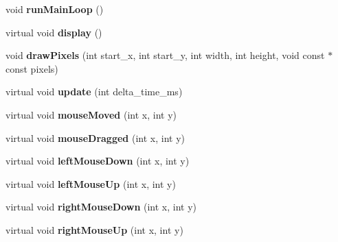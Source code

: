 \begin{DoxyCompactItemize}
\item 
\hypertarget{classBaseGfxApp_acda031916c00d56c2dc901e2653e3083}{void {\bfseries run\-Main\-Loop} ()}\label{classBaseGfxApp_acda031916c00d56c2dc901e2653e3083}

\item 
\hypertarget{classBaseGfxApp_ac8de2d5a955582547af5619b771b4d6d}{virtual void {\bfseries display} ()}\label{classBaseGfxApp_ac8de2d5a955582547af5619b771b4d6d}

\item 
\hypertarget{classBaseGfxApp_a4b8d896c2fff8482553207552bc54f0a}{void {\bfseries draw\-Pixels} (int start\-\_\-x, int start\-\_\-y, int width, int height, void const $\ast$const pixels)}\label{classBaseGfxApp_a4b8d896c2fff8482553207552bc54f0a}

\item 
\hypertarget{classBaseGfxApp_a67737f7cc360b008394b1e882ed5b5d6}{virtual void {\bfseries update} (int delta\-\_\-time\-\_\-ms)}\label{classBaseGfxApp_a67737f7cc360b008394b1e882ed5b5d6}

\item 
\hypertarget{classBaseGfxApp_a0956b82d7fa58b623c498aea7073dbba}{virtual void {\bfseries mouse\-Moved} (int x, int y)}\label{classBaseGfxApp_a0956b82d7fa58b623c498aea7073dbba}

\item 
\hypertarget{classBaseGfxApp_abb23f716dd6612b3a72938e41525d338}{virtual void {\bfseries mouse\-Dragged} (int x, int y)}\label{classBaseGfxApp_abb23f716dd6612b3a72938e41525d338}

\item 
\hypertarget{classBaseGfxApp_aaaccf5a5e923a9465441a5ee712424a8}{virtual void {\bfseries left\-Mouse\-Down} (int x, int y)}\label{classBaseGfxApp_aaaccf5a5e923a9465441a5ee712424a8}

\item 
\hypertarget{classBaseGfxApp_a0a2961a932b02b2f9d7d0bb408f6fb51}{virtual void {\bfseries left\-Mouse\-Up} (int x, int y)}\label{classBaseGfxApp_a0a2961a932b02b2f9d7d0bb408f6fb51}

\item 
\hypertarget{classBaseGfxApp_afa87e6a71220945e41f0424e540125d9}{virtual void {\bfseries right\-Mouse\-Down} (int x, int y)}\label{classBaseGfxApp_afa87e6a71220945e41f0424e540125d9}

\item 
\hypertarget{classBaseGfxApp_a812643d563522a993457dd565c33f8f6}{virtual void {\bfseries right\-Mouse\-Up} (int x, int y)}\label{classBaseGfxApp_a812643d563522a993457dd565c33f8f6}


\end{DoxyCompactItemize}
